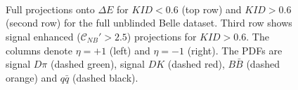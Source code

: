 \documentclass[aps,prl,twocolumn,superscriptaddress,showpacs,preprintnumbers,amsmath,amssymb]{revtex4}
\begin{document}
\begin{figure}

\centering
\mbox{\quad
{}}

\mbox{\quad
{}}

\mbox{\quad
{}}


\caption{Full projections onto $\Delta E$ for $KID < 0.6$ (top row) and $KID > 0.6$ (second row) for the full unblinded Belle dataset. Third row shows signal enhanced ($\mathcal{C}_{NB}' > 2.5$) projections for $KID > 0.6$. The columns denote $\eta = +1$ (left) and $\eta = -1$ (right). The PDFs are signal $D\pi$ (dashed green), signal $DK$ (dashed red), $B\bar{B}$ (dashed orange) and $q\bar{q}$ (dashed black). } \label{fig:Figure 1}
\end{figure} 
\end{document}
